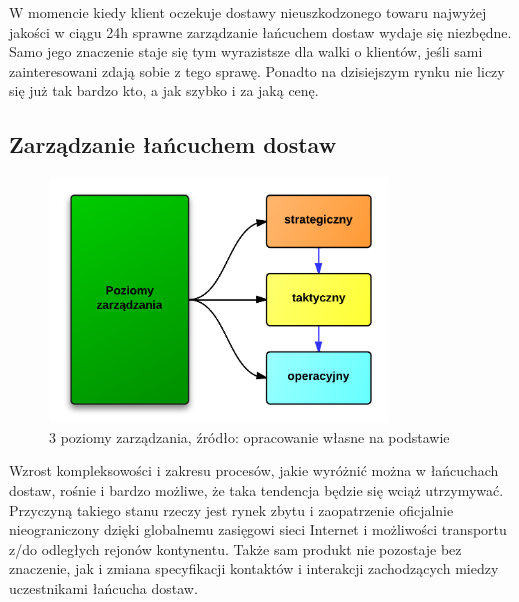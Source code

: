 		W momencie kiedy klient oczekuje dostawy nieuszkodzonego 
		towaru najwyżej jakości w ciągu 24h sprawne zarządzanie 
		łańcuchem dostaw wydaje się niezbędne. Samo jego znaczenie staje
		się tym wyrazistsze dla walki o klientów, jeśli sami zainteresowani
		zdają sobie z tego sprawę. Ponadto na dzisiejszym rynku nie liczy się
		już tak bardzo kto, a jak szybko i za jaką cenę.
		
	\subsection{Zarządzanie łańcuchem dostaw}
		\begin{figure}[h]
			\centering
			\includegraphics[width=0.8\textwidth]{images/3LevelsScm}
			\caption[3 poziomy zarządzania łańcuchem dostaw]{
				3 poziomy zarządzania, źródło: opracowanie własne na podstawie \cite{ewolucja_lancuchow_dostaw_cz1}
			}
			\label{fig:3_levels_of_supply_chain}
		\end{figure}
		
		Wzrost kompleksowości i zakresu procesów, jakie wyróżnić można
		w łańcuchach dostaw, rośnie i bardzo możliwe, że taka tendencja będzie
		się wciąż utrzymywać. Przyczyną takiego stanu rzeczy jest rynek zbytu
		i zaopatrzenie oficjalnie nieograniczony dzięki globalnemu zasięgowi
		sieci Internet i możliwości transportu z/do odległych rejonów kontynentu. Także
		sam produkt nie pozostaje bez znaczenie, jak i zmiana specyfikacji kontaktów
		i interakcji zachodzących miedzy uczestnikami łańcucha dostaw. \\
		
